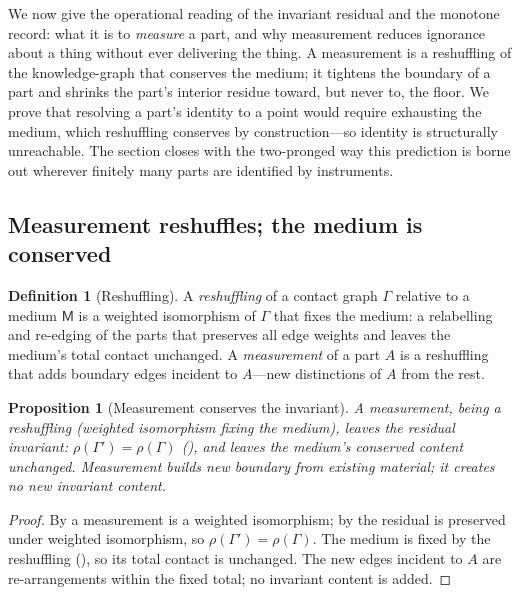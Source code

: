 \documentclass[11pt,a4paper]{article}
\theoremstyle{thmstyle}
\newtheorem{proposition}[theorem]{Proposition}
\theoremstyle{definition}
\newtheorem{definition}[theorem]{Definition}
\theoremstyle{remark}
\newcommand{\Gph}{\Gamma}                 %
\newcommand{\Res}{\rho}                   %
\newcommand{\med}{\mathsf{M}}             %
\begin{document}
We now give the operational reading of the invariant residual and the monotone
record: what it is to \emph{measure} a part, and why measurement reduces ignorance
about a thing without ever delivering the thing. A measurement is a reshuffling of
the knowledge-graph that conserves the medium; it tightens the boundary of a part
and shrinks the part's interior residue toward, but never to, the floor. We prove
that resolving a part's identity to a point would require exhausting the medium,
which reshuffling conserves by construction---so identity is structurally
unreachable. The section closes with the two-pronged way this prediction is borne
out wherever finitely many parts are identified by instruments.

\subsection{Measurement reshuffles; the medium is conserved}

\begin{definition}[Reshuffling]
\label{def:reshuffle}
A \emph{reshuffling} of a contact graph $\Gph$ relative to a medium $\med$ is a
weighted isomorphism of $\Gph$ that fixes the medium: a relabelling and
re-edging of the parts that preserves all edge weights and leaves the medium's
total contact unchanged. A \emph{measurement} of a part $A$ is a reshuffling that
adds boundary edges incident to $A$---new distinctions of $A$ from the rest.
\end{definition}

\begin{proposition}[Measurement conserves the invariant]
\label{prop:measure-conserves}
A measurement, being a reshuffling \textup{(}weighted isomorphism fixing the
medium\textup{)}, leaves the residual invariant: $\Res(\Gph')=\Res(\Gph)$
\textup{(}\textup{)}, and leaves the medium's
conserved content unchanged. Measurement builds new boundary from existing
material; it creates no new invariant content.
\end{proposition}

\begin{proof}
By  a measurement is a weighted isomorphism; by
 the residual is preserved under weighted
isomorphism, so $\Res(\Gph')=\Res(\Gph)$. The medium is fixed by the reshuffling
(), so its total contact is unchanged. The new edges incident
to $A$ are re-arrangements within the fixed total; no invariant content is added.
\end{proof}
\end{document}

